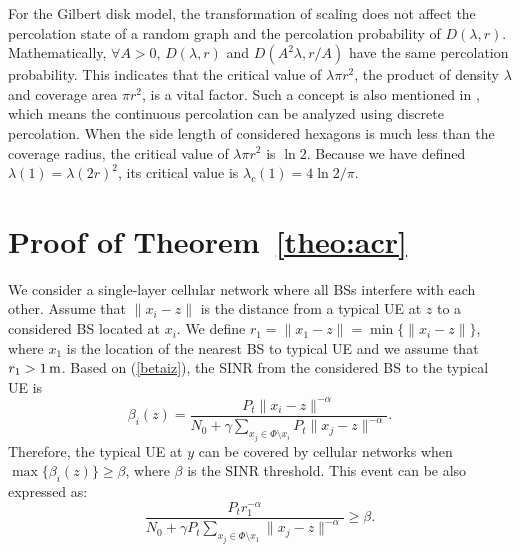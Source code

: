 \documentclass[final]{IEEEtran}
\begin{document}
\indent For the Gilbert disk model, the transformation of scaling does not affect the percolation state of a random graph and the percolation probability of $D(\lambda,r)$. Mathematically, $\forall A>0$, $D(\lambda,r)$ and $D(A^2\lambda,r/A)$ have the same percolation probability. This indicates that the critical value of $\lambda \pi r^2$, the product of density $\lambda$ and coverage area $\pi r^2$, is a vital factor. Such a concept is also mentioned in \cite{haenggi2012stochastic}, which means the continuous percolation can be analyzed using discrete percolation. When the side length of considered hexagons is much less than the coverage radius, the critical value of $\lambda\pi r^2$ is $\ln 2$. Because we have defined $\lambda(1)=\lambda (2r)^2$, its critical value is $\lambda_c(1)=4\ln 2/\pi$. 

\section{Proof of Theorem~\ref{theo:acr}}\label{app:acr}
We consider a single-layer cellular network where all BSs interfere with each other. Assume that $\|x_{i}-z\|$ is the distance from a typical UE at $z$ to a considered BS located at $x_{i}$. We define $r_{1}=\|x_{1}-z\|=\min\{\|x_{i}-z\|\}$, where $x_{1}$ is the location of the nearest BS to typical UE and we assume that $r_{1}>1\,{\rm m}$. Based on (\ref{betaiz}), the SINR from the considered BS to the typical UE is 
\begin{equation}
    \beta_{i}(z)=\frac{P_t \|x_{i}-z\|^{-\alpha}}{N_0+\gamma\sum\limits_{x_{j}\in\Phi\setminus x_{i}}P_t\|x_{j}-z\|^{-\alpha}}.
\end{equation}
\indent Therefore, the typical UE at $y$ can be covered by cellular networks when $\max\{\beta_{i}(z)\}\geq\beta$, where $\beta$ is the SINR threshold. This event can be also expressed as:
\begin{equation}
\frac{P_t r_{1}^{-\alpha}}{N_0+\gamma P_t\sum\limits_{x_{j}\in\Phi\setminus x_{1}}\|x_{j}-z\|^{-\alpha}}\geq\beta.
\end{equation}
\end{document}
